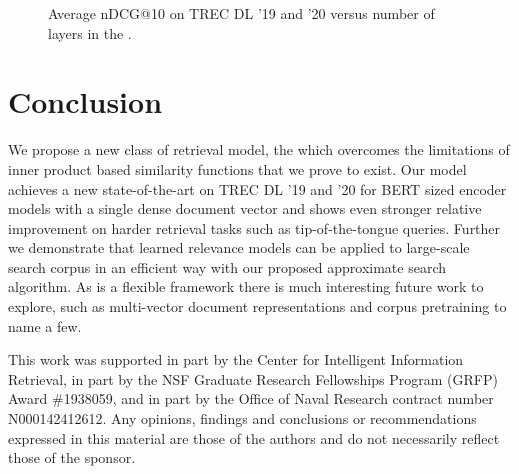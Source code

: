 \documentclass[sigconf,]{acmart}
\begin{document}
\begin{figure}
    \centering
    \caption{Average nDCG@10 on TREC DL '19 and '20 versus number of layers in the \mininame{}.} \label{fig:MiniModelLayers}
    \label{fig:layer_versus_ndcg}
\vspace{-10pt}
\end{figure}


\section{Conclusion}
We propose a new class of retrieval model, the \name{} which overcomes the limitations of inner product based similarity functions that we prove to exist. Our model achieves a new state-of-the-art on TREC DL '19 and '20 for BERT sized encoder models with a single dense document vector and shows even stronger relative improvement on harder retrieval tasks such as tip-of-the-tongue queries. Further we demonstrate that learned relevance models can be applied to large-scale search corpus in an efficient way with our proposed approximate search algorithm. As \name{} is a flexible framework there is much interesting future work to explore, such as multi-vector document representations and corpus pretraining to name a few.

\begin{acks}
    This work was supported in part by the Center for Intelligent Information Retrieval, in part by the NSF Graduate Research Fellowships Program (GRFP) Award \#1938059, and in part by the Office of Naval Research contract number N000142412612. Any opinions, findings and conclusions or recommendations expressed in this material are those of the authors and do not necessarily reflect those of the sponsor.

\end{acks}



\end{document}
